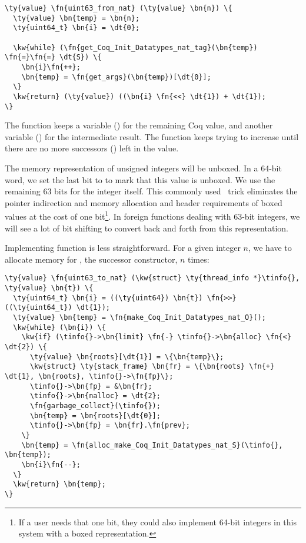\begin{Verbatim}
\ty{value} \fn{uint63_from_nat} (\ty{value} \bn{n}) \{
  \ty{value} \bn{temp} = \bn{n};
  \ty{uint64_t} \bn{i} = \dt{0};

  \kw{while} (\fn{get_Coq_Init_Datatypes_nat_tag}(\bn{temp}) \fn{=}\fn{=} \dt{S}) \{
    \bn{i}\fn{++};
    \bn{temp} = \fn{get_args}(\bn{temp})[\dt{0}];
  \}
  \kw{return} (\ty{value}) ((\bn{i} \fn{<<} \dt{1}) + \dt{1});
\}
\end{Verbatim}

The  function keeps a variable () for the remaining Coq  value, and another variable () for the intermediate result. The function keeps trying to increase  until there are no more successors () left in the  value.

The memory representation of unsigned integers will be \gls{unboxed}. In a 64-bit word, we set the last bit to  to mark that this value is \gls{unboxed}. We use the remaining 63 bits for the integer itself. This commonly used~\cite{madhavapeddy2022real, brankov2014what} trick eliminates the pointer indirection and memory allocation and header requirements of \gls{boxed} values at the cost of one bit\footnote{If a user needs that one bit, they could also implement 64-bit integers in this system with a \gls{boxed} representation.}. In \gls{foreign function}s dealing with 63-bit integers, we will see a lot of bit shifting to convert back and forth from this representation. 

Implementing  function is less straightforward. For a given integer $n$, we have to allocate memory for , the successor constructor, $n$ times:

\begin{Verbatim}
\ty{value} \fn{uint63_to_nat} (\kw{struct} \ty{thread_info *}\tinfo{}, \ty{value} \bn{t}) \{
  \ty{uint64_t} \bn{i} = ((\ty{uint64}) \bn{t}) \fn{>>} ((\ty{uint64_t}) \dt{1});
  \ty{value} \bn{temp} = \fn{make_Coq_Init_Datatypes_nat_O}();
  \kw{while} (\bn{i}) \{
    \kw{if} (\tinfo{}->\bn{limit} \fn{-} \tinfo{}->\bn{alloc} \fn{<} \dt{2}) \{
      \ty{value} \bn{roots}[\dt{1}] = \{\bn{temp}\};
      \kw{struct} \ty{stack_frame} \bn{fr} = \{\bn{roots} \fn{+} \dt{1}, \bn{roots}, \tinfo{}->\fn{fp}\};
      \tinfo{}->\bn{fp} = &\bn{fr};
      \tinfo{}->\bn{nalloc} = \dt{2}; 
      \fn{garbage_collect}(\tinfo{});
      \bn{temp} = \bn{roots}[\dt{0}];
      \tinfo{}->\bn{fp} = \bn{fr}.\fn{prev};
    \}
    \bn{temp} = \fn{alloc_make_Coq_Init_Datatypes_nat_S}(\tinfo{}, \bn{temp});
    \bn{i}\fn{--};
  \}
  \kw{return} \bn{temp};
\}
\end{Verbatim}

